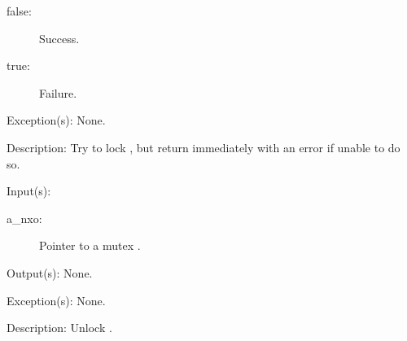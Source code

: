 \begin{capi}
\begin{capilist}
\begin{description}
			\begin{description}\item[]
			\item[false: ]
				Success.
			\item[true: ]
				Failure.
			\end{description}
		\end{description}
	\item[Exception(s): ] None.
	\item[Description: ]
		Try to lock , but return immediately with an error
		if unable to do so.
	\end{capilist}
\label{nxo_mutex_unlock}
	\begin{capilist}
	\item[Input(s): ]
		\begin{description}\item[]
		\item[a\_nxo: ]
			Pointer to a mutex .
		\end{description}
	\item[Output(s): ] None.
	\item[Exception(s): ] None.
	\item[Description: ]
		Unlock .
	\end{capilist}
\end{capi}
